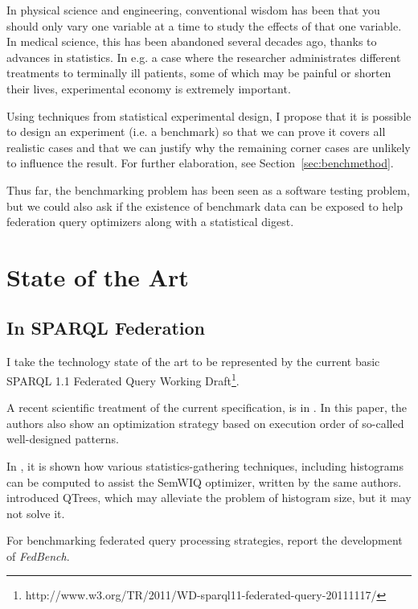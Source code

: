 \documentclass{llncs}
\begin{document}
In physical science and engineering, conventional wisdom has been that
you should only vary one variable at a time to study the effects of
that one variable. In medical science, this has been abandoned several
decades ago, thanks to advances in statistics. In e.g. a case where
the researcher administrates different treatments to terminally ill
patients, some of which may be painful or shorten their lives,
experimental economy is extremely important.

Using techniques from statistical experimental design, I propose
that it is possible to design an experiment (i.e. a benchmark) so that
we can prove it covers all realistic cases and that we can justify
why the remaining corner cases are unlikely to influence the
result. For further elaboration, see Section~\ref{sec:benchmethod}.

Thus far, the benchmarking problem has been seen as a software testing
problem, but we could also ask if the existence of benchmark data can
be exposed to help federation query optimizers along with a
statistical digest.

\section{State of the Art}

\subsection{In SPARQL Federation}

I take the technology state of the art to be represented by the
current basic SPARQL 1.1 Federated Query Working
Draft\footnote{http://www.w3.org/TR/2011/WD-sparql11-federated-query-20111117/}. 

A recent scientific treatment of the current specification, is in
\cite{springerlink:10.1007/978-3-642-21064-8-1}. In this paper, the
authors also show an optimization strategy based on execution order of
so-called well-designed patterns.

In \cite{5337556}, it is shown how various statistics-gathering
techniques, including histograms can be computed to assist the SemWIQ
optimizer, written by the same authors.
\cite{Harth:2010:DSO:1772690.1772733} introduced QTrees, which may
alleviate the problem of histogram size, but it may not solve it.

For benchmarking federated query processing strategies,
\cite{Schmidt:2011:FBS:2063016.2063054} report the development of \emph{FedBench}.
\end{document}
